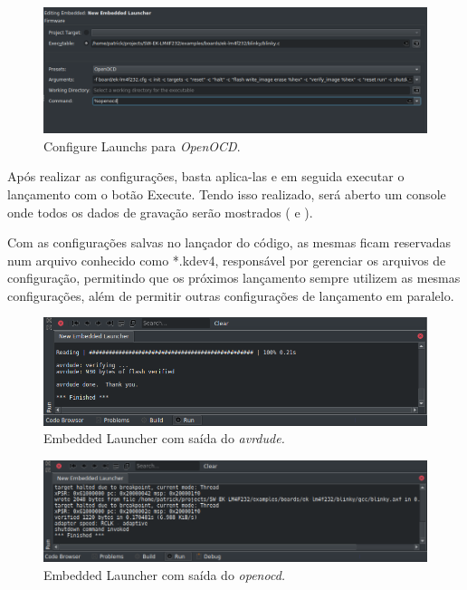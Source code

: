 \begin{figure}[!htb]
  \centering
  \includegraphics[width=1\textwidth]{figuras/openocd.png}
  \caption[\textit{Configure Launchs} para \textit{OpenOCD}]{Configure Launchs para \textit{OpenOCD}.}
  \label{fig:openocd}
\end{figure}

Após realizar as configurações, basta aplica-las e em seguida executar o lançamento com o botão Execute. Tendo isso realizado, será aberto um console onde todos os dados de gravação serão mostrados ( e ).

Com as configurações salvas no lançador do código, as mesmas ficam reservadas num arquivo conhecido como *.kdev4, responsável por gerenciar os arquivos de configuração, permitindo que os próximos lançamento sempre utilizem as mesmas configurações, além de permitir outras configurações de lançamento em paralelo.

\begin{figure}[!htb]
  \centering
  \includegraphics[width=1\textwidth]{figuras/runavrdude.png}
  \caption[\textit{Embedded Launcher} com \textit{avrdude}]{Embedded Launcher com saída do \textit{avrdude.}}
  \label{fig:runavrdude}
\end{figure}

\begin{figure}[!htb]
  \centering
  \includegraphics[width=1\textwidth]{figuras/runopenocd.png}
  \caption[\textit{Embedded Launcher} com \textit{openocd}]{Embedded Launcher com saída do \textit{openocd.}}
  \label{fig:runopenocd}
\end{figure}

